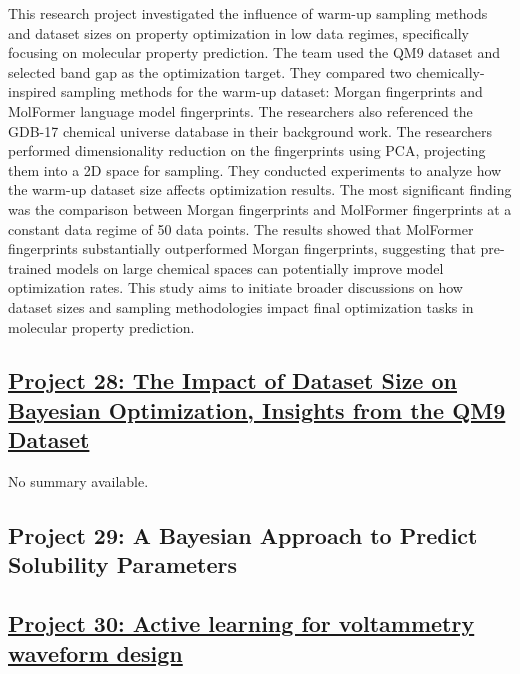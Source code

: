 This research project investigated the influence of warm-up sampling methods and dataset sizes on property optimization in low data regimes, specifically focusing on molecular property prediction. The team used the QM9 dataset\cite{ramakrishnan_quantum_2014} and selected band gap as the optimization target. They compared two chemically-inspired sampling methods for the warm-up dataset: Morgan fingerprints and MolFormer language model fingerprints. The researchers also referenced the GDB-17 chemical universe database\cite{ruddigkeit_enumeration_2012} in their background work. The researchers performed dimensionality reduction on the fingerprints using PCA, projecting them into a 2D space for sampling. They conducted experiments to analyze how the warm-up dataset size affects optimization results. The most significant finding was the comparison between Morgan fingerprints and MolFormer fingerprints at a constant data regime of 50 data points. The results showed that MolFormer fingerprints substantially outperformed Morgan fingerprints, suggesting that pre-trained models on large chemical spaces can potentially improve model optimization rates. This study aims to initiate broader discussions on how dataset sizes and sampling methodologies impact final optimization tasks in molecular property prediction.
 \subsection*{\href{https://www.youtube.com/watch?v=hvODyYejxuc}{Project 28: The Impact of Dataset Size on Bayesian Optimization, Insights from the QM9 Dataset}}

No summary available.
 \subsection*{Project 29: A Bayesian Approach to Predict Solubility Parameters}


 \subsection*{\href{https://www.youtube.com/watch?v=78bKXIIB_GA}{Project 30: Active learning for voltammetry waveform design}}

